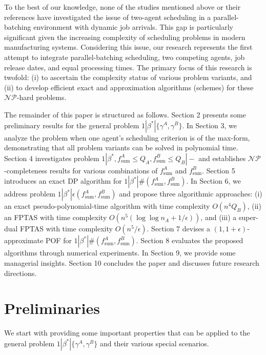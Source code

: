 \documentclass[12pt]{article}
\begin{document}
\begin{sloppypar}
To the best of our knowledge, none of the studies mentioned above or their references have investigated the issue of two-agent scheduling in a parallel-batching environment with dynamic job arrivals. This gap is particularly significant given the increasing complexity of scheduling problems in modern manufacturing systems. Considering this issue, our research represents the first attempt to integrate parallel-batching scheduling, two competing agents, job release dates, and equal processing times. The primary focus of this research is twofold: (i) to ascertain the complexity status of various problem variants, and (ii) to develop efficient exact and approximation algorithms (schemes) for these $\mathcal{NP}$-hard problems.

The remainder of this paper is structured as follows. Section 2 presents some preliminary results for the general problem $1 | \beta^{*} |\{\gamma^A, \gamma^B\}$. In Section 3, we analyze the problem when one agent's scheduling criterion is of the max-form, demonstrating that all problem variants can be solved in polynomial time. Section 4 investigates problem $1 | \beta^{*}, f_{\mathrm{sum}}^A \leq Q_A, f_{\mathrm{sum}}^B \leq Q_B|-$ and establishes $\mathcal{NP}$-completeness results for various combinations of $f_{\mathrm{sum}}^A$ and $f_{\mathrm{sum}}^B$. Section 5 introduces an exact DP algorithm for $1 | \beta^{*}|\#(f_{\mathrm{sum}}^A, f_{\mathrm{sum}}^B)$. In Section 6, we address problem $1 | \beta^{*}|\epsilon(f_{\mathrm{sum}}^A, f_{\mathrm{sum}}^B)$ and propose three algorithmic approaches: (i) an exact pseudo-polynomial-time algorithm with time complexity $O(n^4 Q_B)$, (ii) an FPTAS with time complexity $O(n^5 (\log \log n_A+ 1/\epsilon))$, and (iii) a super-dual FPTAS with time complexity $O(n^5 /\epsilon)$. Section 7 devises a $(1, 1+\epsilon)$-approximate POF for $1 | \beta^{*}|\#(f_{\mathrm{sum}}^A, f_{\mathrm{sum}}^B)$. Section 8  evaluates the proposed algorithms through numerical experiments. In Section 9, we provide some managerial insights. Section 10 concludes the paper and discusses future research directions.

\section{Preliminaries}

We start with providing some important properties that can be applied to the general problem
$1 | \beta^{*} |\{\gamma^A, \gamma^B\}$ and their various special scenarios.


\end{sloppypar}
\end{document}
